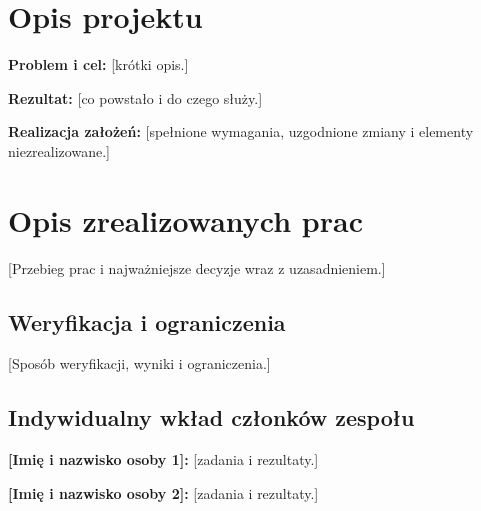 \documentclass[11pt,a4paper,oneside]{article}
\newif\ifpodpowiedzi
\newcommand{\podpowiedz}[1]{\ifpodpowiedzi\par\begingroup\small\color{hintcolor}\textit{Wskazówka: #1}\par\endgroup\fi}
\newcommand{\pole}[1]{\textnormal{[#1]}}
\newif\iftrzeciaosoba
\newcommand{\studentA}{\pole{Imię i nazwisko osoby 1}}
\newcommand{\studentB}{\pole{Imię i nazwisko osoby 2}}
\newcommand{\studentC}{\pole{Imię i nazwisko osoby 3}}
\begin{document}
\tableofcontents
\podpowiedz{Sprawozdanie podsumowuje cały projekt. Opisz uzyskane rezultaty, zgodność z uzgodnionym zakresem i indywidualny wkład. Szczegóły techniczne możesz wskazać przez odwołania do osobnej dokumentacji. Uzupełnij wszystkie pola, usuń przykłady i wyłącz podpowiedzi przed oddaniem. Dla zespołu dwuosobowego zatwierdzonego przez dyrekcję użyj przełącznika w preambule i usuń opis prac trzeciej osoby.}

\section{Opis projektu}
\podpowiedz{Przedstaw problem, cel, odbiorców oraz finalny rezultat. Wyjaśnij praktyczny i inżynierski charakter projektu. Porównaj rezultat z dokumentem ,,Wybór projektu'', uwzględniając późniejsze uzgodnienia.}
\textbf{Problem i cel:} \pole{krótki opis.}\par
\textbf{Rezultat:} \pole{co powstało i do czego służy.}\par
\textbf{Realizacja założeń:} \pole{spełnione wymagania, uzgodnione zmiany i elementy niezrealizowane.}


\section{Opis zrealizowanych prac}
\podpowiedz{Podsumuj etapy realizacji: koncepcję, dobór metod i narzędzi, wykonanie, integrację oraz weryfikację. Dostosuj opis do charakteru projektu; może dotyczyć aplikacji, animacji, prototypu lub innego rezultatu. Nie kopiuj kolejnych raportów bez opracowania podsumowania.}
\pole{Przebieg prac i najważniejsze decyzje wraz z uzasadnieniem.}

\subsection{Weryfikacja i ograniczenia}
\podpowiedz{Opisz, jak sprawdzono realizację celów i jakość rezultatu. Wskaż testy lub inne sprawdzenia, ich wyniki oraz odwołania do dokumentacji. Podaj znane ograniczenia, problemy i możliwe kierunki rozwoju.}
\pole{Sposób weryfikacji, wyniki i ograniczenia.}

\subsection{Indywidualny wkład członków zespołu}
\podpowiedz{Dla każdej osoby opisz konkretne zadania i rezultaty. Przy pracy wspólnej rozróżnij indywidualne obowiązki. Uwzględnij również koncepcję, integrację, testy, dokumentację i organizację pracy. Opis powinien być zgodny z raportami i oświadczeniem o wkładzie.}
\textbf{\studentA:} \pole{zadania i rezultaty.}\par
\textbf{\studentB:} \pole{zadania i rezultaty.}\par
\iftrzeciaosoba
\textbf{\studentC:} \pole{zadania i rezultaty.}\par
\fi
\end{document}
